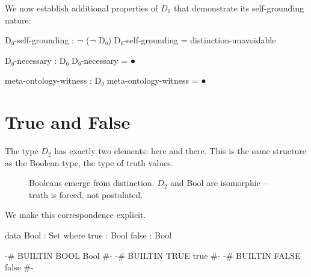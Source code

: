 \documentclass[11pt,a4paper]{book}
\begin{document}
We now establish additional properties of $D_0$ that demonstrate its self-grounding nature:

\begin{code}
D₀-self-grounding : ¬ (¬ D₀)
D₀-self-grounding = distinction-unavoidable

D₀-necessary : D₀
D₀-necessary = ●

meta-ontology-witness : D₀
meta-ontology-witness = ●
\end{code}

\chapter{True and False}

The type $D_2$ has exactly two elements: $\text{here}$ and $\text{there}$. 
This is the same structure as the Boolean type, the type of truth values.

\begin{figure}[h]
\centering
{}
\caption{Booleans emerge from distinction. $D_2$ and Bool are isomorphic—truth is forced, not postulated.}
\label{fig:bool-emergence}
\end{figure}

We make this correspondence explicit.

\begin{code}
data Bool : Set where
  true  : Bool
  false : Bool

{-# BUILTIN BOOL  Bool  #-}
{-# BUILTIN TRUE  true  #-}
{-# BUILTIN FALSE false #-}
\end{code}
\end{document}
